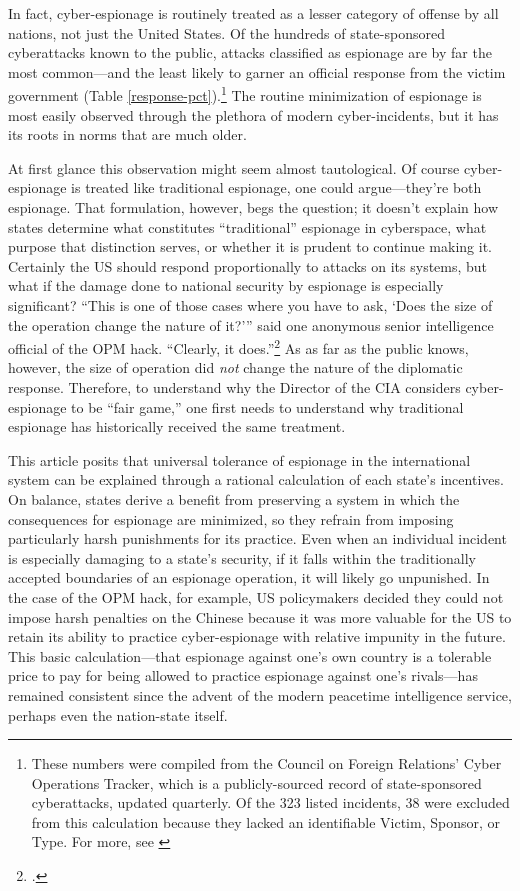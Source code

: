 \documentclass[14pt]{extarticle}
\begin{document}
In fact, cyber-espionage is routinely treated as a lesser category of offense by all nations, not just the United States. Of the hundreds of state-sponsored cyberattacks known to the public, attacks classified as espionage are by far the most common---and the least likely to garner an official response from the victim government (Table \ref{response-pct}).\footnote{These numbers were compiled from the Council on Foreign Relations' Cyber Operations Tracker, which is a publicly-sourced record of state-sponsored cyberattacks, updated quarterly. Of the 323 listed incidents, 38 were excluded from this calculation because they lacked an identifiable Victim, Sponsor, or Type. For more, see \cite{council_on_foreign_relations_new_2019}} The routine minimization of espionage is most easily observed through the plethora of modern cyber-incidents, but it has its roots in norms that are much older.

At first glance this observation might seem almost tautological. Of course cyber-espionage is treated like traditional espionage, one could argue---they're both espionage. That formulation, however, begs the question; it doesn't explain how states determine what constitutes \enquote{traditional} espionage in cyberspace, what purpose that distinction serves, or whether it is prudent to continue making it. Certainly the US should respond proportionally to attacks on its systems, but what if the damage done to national security by espionage is especially significant? ``This is one of those cases where you have to ask, `Does the size of the operation change the nature of it?'\thinspace'' said one anonymous senior intelligence official of the OPM hack. \enquote{Clearly, it does.}\footcite{sanger_u.s._2015} As as far as the public knows, however, the size of operation did \emph{not} change the nature of the diplomatic response. Therefore, to understand why the Director of the CIA considers cyber-espionage to be \enquote{fair game,} one first needs to understand why traditional espionage has historically received the same treatment.

This article posits that universal tolerance of espionage in the international system can be explained through a rational calculation of each state's incentives. On balance, states derive a benefit from preserving a system in which the consequences for espionage are minimized, so they refrain from imposing particularly harsh punishments for its practice. Even when an individual incident is especially damaging to a state's security, if it falls within the traditionally accepted boundaries of an espionage operation, it will likely go unpunished. In the case of the OPM hack, for example, US policymakers decided they could not impose harsh penalties on the Chinese because it was more valuable for the US to retain its ability to practice cyber-espionage with relative impunity in the future. This basic calculation---that espionage against one's own country is a tolerable price to pay for being allowed to practice espionage against one's rivals---has remained consistent since the advent of the modern peacetime intelligence service, perhaps even the nation-state itself.
\end{document}
